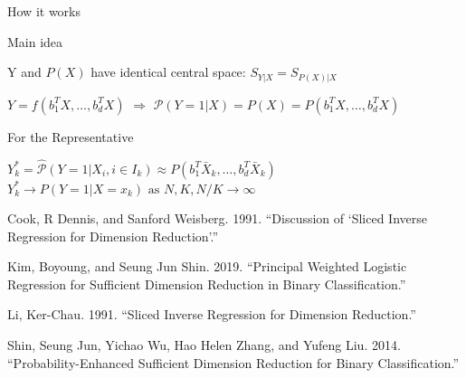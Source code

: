\documentclass[ignorenonframetext,]{beamer}
\begin{document}
\begin{frame}{How it works}

\begin{block}{Main idea}

Y and \(P(X)\) have identical central space: \(S_{Y|X} = S_{P(X)|X}\)

\begin{center}
$Y = f(b_1^TX, \dots, b_d^TX)$
$\Rightarrow$
$\mathcal{P}(Y = 1 |X) = P(X) = P(b_1^TX, \dots, b_d^TX)$
\end{center}

\end{block}

\begin{block}{For the Representative}

\begin{center}
$Y^*_k = \hat{\mathcal{P}}(Y = 1|X_i, i\in I_k) \approx P(b_1^T\bar{X}_k, \dots, b_d^T\bar{X}_k)$
$Y^*_k \rightarrow P(Y=1|X=x_k) \text{ as } N,K,N/K \to \infty$
\end{center}

\hypertarget{refs}{}
\hypertarget{ref-ref7}{}
Cook, R Dennis, and Sanford Weisberg. 1991. ``Discussion of `Sliced
Inverse Regression for Dimension Reduction'.''

\hypertarget{ref-ref9}{}
Kim, Boyoung, and Seung Jun Shin. 2019. ``Principal Weighted Logistic
Regression for Sufficient Dimension Reduction in Binary
Classification.''

\hypertarget{ref-ref6}{}
Li, Ker-Chau. 1991. ``Sliced Inverse Regression for Dimension
Reduction.''

\hypertarget{ref-ref8}{}
Shin, Seung Jun, Yichao Wu, Hao Helen Zhang, and Yufeng Liu. 2014.
``Probability-Enhanced Sufficient Dimension Reduction for Binary
Classification.''

\end{block}

\end{frame}
\end{document}

